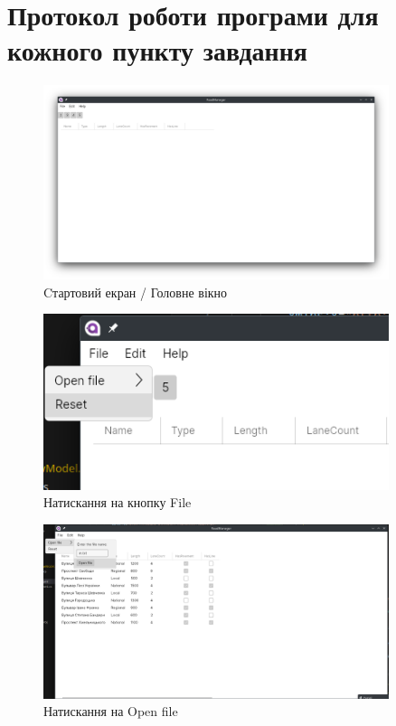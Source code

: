 \documentclass[14pt]{extarticle}
\begin{document}
\section{Протокол роботи програми для кожного пункту завдання}
\begin{figure}[H]
    \centering
    \includegraphics[width=0.90\textwidth]{startup.png}
    \caption{Cтартовий екран / Головне вікно}
\end{figure}
\begin{figure}[H]
    \centering
    \includegraphics[width=0.90\textwidth]{on_file_click.png}
    \caption{Натискання на кнопку File}
\end{figure}
\begin{figure}[H]
    \centering
    \includegraphics[width=0.90\textwidth]{on_file_open_click_good.png}
    \caption{Натискання на Open file}
\end{figure}
\end{document}

